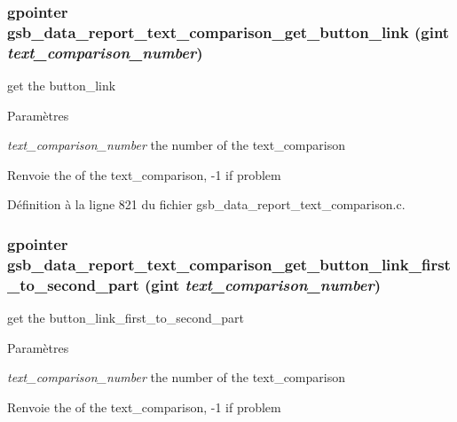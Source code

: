 \subsubsection[{gsb\_\-data\_\-report\_\-text\_\-comparison\_\-get\_\-button\_\-link}]{\setlength{\rightskip}{0pt plus 5cm}gpointer gsb\_\-data\_\-report\_\-text\_\-comparison\_\-get\_\-button\_\-link (gint {\em text\_\-comparison\_\-number})}\label{gsb__data__report__text__comparison_8c_a55a45156d527aca803836805f7adbff5}
get the button\_\-link


\begin{DoxyParams}{Paramètres}
\item[{\em text\_\-comparison\_\-number}]the number of the text\_\-comparison\end{DoxyParams}
\begin{DoxyReturn}{Renvoie}
the of the text\_\-comparison, -\/1 if problem 
\end{DoxyReturn}


Définition à la ligne 821 du fichier gsb\_\-data\_\-report\_\-text\_\-comparison.c.

\subsubsection[{gsb\_\-data\_\-report\_\-text\_\-comparison\_\-get\_\-button\_\-link\_\-first\_\-to\_\-second\_\-part}]{\setlength{\rightskip}{0pt plus 5cm}gpointer gsb\_\-data\_\-report\_\-text\_\-comparison\_\-get\_\-button\_\-link\_\-first\_\-to\_\-second\_\-part (gint {\em text\_\-comparison\_\-number})}\label{gsb__data__report__text__comparison_8c_ae935aa748f908f852a8cf7e17c4c8c80}
get the button\_\-link\_\-first\_\-to\_\-second\_\-part


\begin{DoxyParams}{Paramètres}
\item[{\em text\_\-comparison\_\-number}]the number of the text\_\-comparison\end{DoxyParams}
\begin{DoxyReturn}{Renvoie}
the of the text\_\-comparison, -\/1 if problem 
\end{DoxyReturn}


